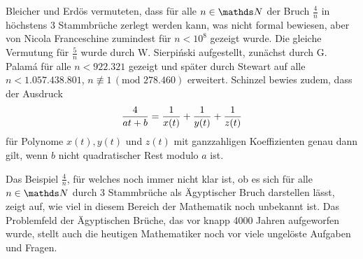 Bleicher und Erdös vermuteten, dass für alle $n \in \N$ der Bruch $\frac{4}{n}$ in höchstens 3 Stammbrüche zerlegt werden kann, was nicht formal bewiesen, aber von Nicola Franceschine zumindest für $n < 10^8$ gezeigt wurde. Die gleiche Vermutung für $\frac{5}{n}$ wurde durch W. Sierpiński aufgestellt, zunächst durch G. Palamá für alle $n < 922.321$ gezeigt und später durch Stewart auf alle $n < 1.057.438.801$, $n \not\equiv 1\, (\text{mod } 278.460)$ erweitert.
Schinzel bewies zudem, dass der Ausdruck
$$\frac{4}{at+b} = \frac{1}{x(t)} + \frac{1}{y(t)} + \frac{1}{z(t)}$$
für Polynome $x(t), y(t)$ und $z(t)$ mit ganzzahligen Koeffizienten genau dann gilt, wenn $b$ nicht quadratischer Rest modulo $a$ ist. \cite[S. 88]{Guy1981}

Das Beispiel $\frac{4}{n}$, für welches noch immer nicht klar ist, ob es sich für alle $n \in \N$ durch 3 Stammbrüche als Ägyptischer Bruch darstellen lässt, zeigt auf, wie viel in diesem Bereich der Mathematik noch unbekannt ist. Das Problemfeld der Ägyptischen Brüche, das vor knapp 4000 Jahren aufgeworfen wurde, stellt auch die heutigen Mathematiker noch vor viele ungelöste Aufgaben und Fragen.